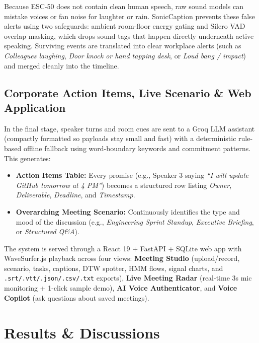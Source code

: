 \documentclass[letterpaper,12pt]{article}
\begin{document}
Because ESC-50 does not contain clean human speech, raw sound models can mistake voices or fan noise for laughter or rain. SonicCaption prevents these false alerts using two safeguards: ambient room-floor energy gating and Silero VAD \cite{silero2021vad} overlap masking, which drops sound tags that happen directly underneath active speaking. Surviving events are translated into clear workplace alerts (such as \textit{Colleagues laughing}, \textit{Door knock or hand tapping desk}, or \textit{Loud bang / impact}) and merged cleanly into the timeline.

\subsection{Corporate Action Items, Live Scenario \& Web Application}
In the final stage, speaker turns and room cues are sent to a Groq LLM assistant (compactly formatted so payloads stay small and fast) with a deterministic rule-based offline fallback using word-boundary keywords and commitment patterns. This generates:
\begin{itemize}
    \item \textbf{Action Items Table:} Every promise (e.g., Speaker 3 saying \textit{``I will update GitHub tomorrow at 4 PM''}) becomes a structured row listing \textit{Owner}, \textit{Deliverable}, \textit{Deadline}, and \textit{Timestamp}.
    \item \textbf{Overarching Meeting Scenario:} Continuously identifies the type and mood of the discussion (e.g., \textit{Engineering Sprint Standup}, \textit{Executive Briefing}, or \textit{Structured Q\&A}).
\end{itemize}
The system is served through a React 19 + FastAPI + SQLite web app with WaveSurfer.js playback across four views: \textbf{Meeting Studio} (upload/record, scenario, tasks, captions, DTW spotter, HMM flows, signal charts, and \texttt{.srt/.vtt/.json/.csv/.txt} exports), \textbf{Live Meeting Radar} (real-time 3s mic monitoring + 1-click sample demo), \textbf{AI Voice Authenticator}, and \textbf{Voice Copilot} (ask questions about saved meetings).

\section{Results \& Discussions}
\end{document}

